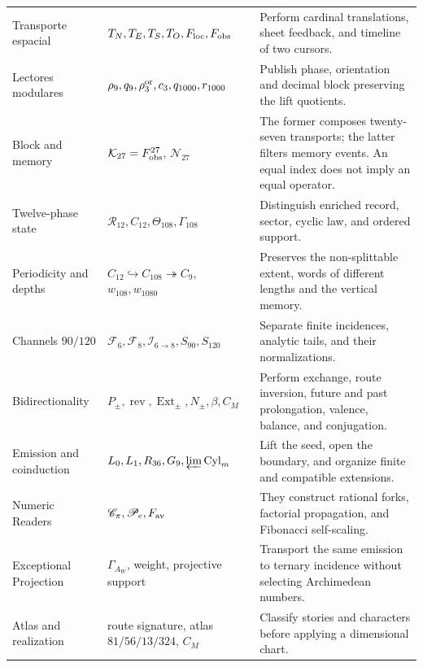{\begin{longtable}{@{}>{\raggedright\arraybackslash}p{}>{\raggedright\arraybackslash}p{}>{\raggedright\arraybackslash}p{}@{}}
Transporte espacial&
\(T_N,T_E,T_S,T_O,F_{\rm loc},F_{\rm obs}\)&
Perform cardinal translations, sheet feedback, and timeline of two cursors.\\

Lectores modulares&
\(\rho_9,q_9,\rho_3^{\rm or},c_3,q_{1000},r_{1000}\)&
Publish phase, orientation and decimal block preserving the lift quotients.\\

Block and memory&
\(\mathcal K_{27}=F_{\rm obs}^{27}\), \(\mathcal N_{27}\)&
The former composes twenty-seven transports; the latter filters memory
events. An equal index does not imply an equal operator.\\

Twelve-phase state&
\(\mathcal R_{12},C_{12},\Theta_{108},\Gamma_{108}\)&
Distinguish enriched record, sector, cyclic law, and ordered support.\\

Periodicity and depths&
\(C_{12}\hookrightarrow C_{108}\twoheadrightarrow C_9\),
\(w_{108},w_{1080}\)&
Preserves the non-splittable extent, words of different lengths and
the vertical memory.\\

Channels \(90/120\)&
\(\mathcal F_6,\mathcal F_8,\mathcal I_{6\to8},
S_{90},S_{120}\)&
Separate finite incidences, analytic tails, and their normalizations.\\

Bidirectionality&
\(P_\pm,\operatorname{rev},\operatorname{Ext}_\pm,
N_\pm,\beta,C_M\)&
Perform exchange, route inversion, future and past prolongation, valence, balance, and conjugation.\\

Emission and coinduction&
\(L_0,L_1,R_{36},G_9,\varprojlim\operatorname{Cyl}_m\)&
Lift the seed, open the boundary, and organize finite and compatible extensions.\\

Numeric Readers&
\(\mathscr C_\pi,\mathscr P_e,F_{\rm av}\)&
They construct rational forks, factorial propagation, and Fibonacci self-scaling.\\

Exceptional Projection&
\(\Gamma_{A_W}\), weight, projective support&
Transport the same emission to ternary incidence without selecting Archimedean numbers.\\

Atlas and realization&
route signature, atlas \(81/56/13/324\), \(C_M\)&
Classify stories and characters before applying a dimensional chart.\\


\end{longtable}}

